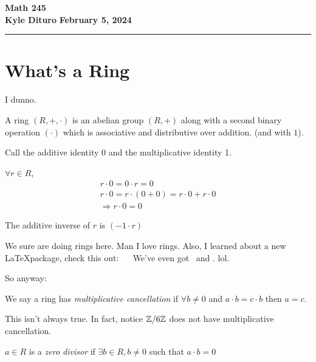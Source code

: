 \documentclass[12pt, twosided]{article}
\begin{document}
\noindent \textbf{Math 245} \hfill \textbf{} \\
\textbf{Kyle Dituro} \hfill \textbf{February 5\tht, 2024}\hrule
\vspace{.2in}

\section{What's a Ring}
I dunno.

\begin{df}
  A ring \((R, +, \cdot)\) is an abelian group \((R, +)\) along with a second binary operation \((\cdot)\) which is associative and distributive over addition. (and with \(1\)).
\end{df}

\begin{notn}
  Call the additive identity \(0\) and the multiplicative identity 1.
\end{notn}

\begin{prop}
  \(\forall r \in R\),
  \begin{align*}
    r \cdot 0 = 0 \cdot r = 0 \\
    r \cdot 0 = r\cdot (0 + 0) = r \cdot 0 + r \cdot 0 \\
    \Rightarrow r \cdot 0 = 0
  \end{align*}
\end{prop}

\begin{fact}
  The additive inverse of \(r\) is \((-1 \cdot r)\)
\end{fact}

We sure are doing rings here. Man I love rings. Also, I learned about a new \LaTeX package, check this out:
{\huge \fax\ \fax\ \fax} We've even got \Faxmachine\ and \FAX. lol.

So anyway:

\begin{df}
  We say a ring has \textit{multiplicative cancellation} if \(\forall b \neq 0\) and \(a \cdot b = c \cdot b\) then \(a = c\).
\end{df}
\begin{exa}
  This isn't always true. In fact, notice \(\mathbb{Z}/ 6\mathbb{Z}\) does not have multiplicative cancellation.
\end{exa}

\begin{df}
  \(a \in R\) is a \textit{zero divisor} if \(\exists b \in R, b\neq 0\) such that \(a\cdot b = 0\)
\end{df}
\end{document}
